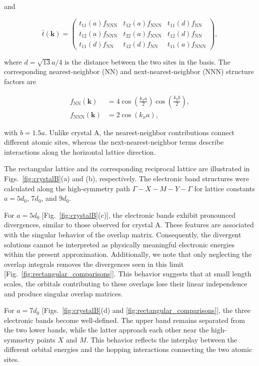 \documentclass[11pt]{article}
\begin{document}
and

\begin{equation}
\label{eq:hoppingB}
\bar{t}(\mathbf{k})
=
\begin{pmatrix}
t_{11}(a)f_{\mathrm{NNN}}
&
t_{12}(a)f_{\mathrm{NNN}}
&
t_{11}(d)f_{\mathrm{NN}}
\\
t_{12}(a)f_{\mathrm{NNN}}
&
t_{22}(a)f_{\mathrm{NNN}}
&
t_{12}(d)f_{\mathrm{NN}}
\\
t_{11}(d)f_{\mathrm{NN}}
&
t_{12}(d)f_{\mathrm{NN}}
&
t_{11}(a)f_{\mathrm{NNN}}
\end{pmatrix},
\end{equation}

where $d=\sqrt{13}a/4$ is the distance between the two sites in the basis. The corresponding nearest-neighbor (NN) and next-nearest-neighbor (NNN) structure factors are

\begin{align}
f_{\mathrm{NN}}(\mathbf{k})
&=
4\cos\left(\frac{k_xa}{2}\right)
\cos\left(\frac{k_yb}{2}\right),
\\
f_{\mathrm{NNN}}(\mathbf{k})
&=
2\cos(k_xa),
\end{align}

with $b=1.5a$. Unlike crystal A, the nearest-neighbor contributions connect different atomic sites, whereas the next-nearest-neighbor terms describe interactions along the horizontal lattice direction.

The rectangular lattice and its corresponding reciprocal lattice are illustrated in Figs.~\ref{fig:crystalB}(a) and (b), respectively. The electronic band structures were calculated along the high-symmetry path $\Gamma-X-M-Y-\Gamma$ for lattice constants $a=5d_0$, $7d_0$, and $9d_0$.

For $a=5d_0$ [Fig.~\ref{fig:crystalB}(c)], the electronic bands exhibit pronounced divergences, similar to those observed for crystal A. These features are associated with the singular behavior of the overlap matrix. Consequently, the divergent solutions cannot be interpreted as physically meaningful electronic energies within the present approximation. Additionally, we note that only neglecting the overlap integrals removes the divergences seen in this limit [Fig.~\ref{fig:rectangular_comparisons}]. This behavior suggests that at small length scales, the orbitals contributing to these overlaps lose their linear independence and produce singular overlap matrices.

For $a=7d_0$ [Figs.~\ref{fig:crystalB}(d) and \ref{fig:rectangular_comparisons}], the three electronic bands become well-defined. The upper band remains separated from the two lower bands, while the latter approach each other near the high-symmetry points $X$ and $M$. This behavior reflects the interplay between the different orbital energies and the hopping interactions connecting the two atomic sites.
\end{document}
